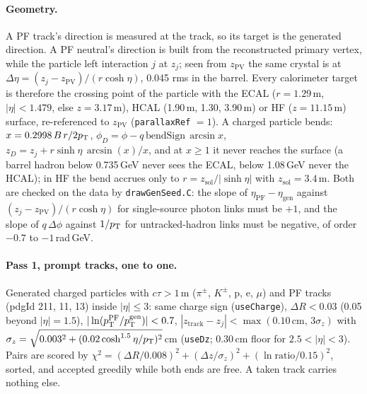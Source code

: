 \paragraph{Geometry.} A PF track's direction is measured at the track, so its
target is the generated direction. A PF neutral's direction is built from the
reconstructed primary vertex, while the particle left interaction $j$ at
$z_j$; seen from $z_{\mathrm{PV}}$ the same crystal is at $\Delta\eta = (z_j -
z_{\mathrm{PV}})/(r\cosh\eta)$, 0.045 rms in the barrel. Every calorimeter
target is therefore the crossing point of the particle with the ECAL
($r = 1.29$\,m, $|\eta| < 1.479$, else $z = 3.17$\,m), HCAL (1.90\,m, 1.30, 3.90\,m)
or HF ($z = 11.15$\,m) surface, re-referenced to $z_{\mathrm{PV}}$
(\texttt{parallaxRef} $= 1$). A charged particle bends: $x = 0.2998\,B\,r/2p_{\mathrm{T}}$,
$\phi_D = \phi - q\,\mathrm{bendSign}\,\arcsin x$, $z_D = z_j + r\sinh\eta\,\arcsin(x)/x$,
and at $x \ge 1$ it never reaches the surface (a barrel hadron below 0.735\,GeV
never sees the ECAL, below 1.08\,GeV never the HCAL); in HF the bend accrues
only to $r = z_{\mathrm{sol}}/|\sinh\eta|$ with $z_{\mathrm{sol}} = 3.4$\,m.
Both are checked on the data by \texttt{drawGenSeed.C}: the slope of
$\eta_{\mathrm{PF}} - \eta_{\mathrm{gen}}$ against $(z_j - z_{\mathrm{PV}})/(r\cosh\eta)$
for single-source photon links must be $+1$, and the slope of $q\,\Delta\phi$
against $1/p_{\mathrm{T}}$ for untracked-hadron links must be negative, of order
$-0.7$ to $-1$\,rad\,GeV.

\paragraph{Pass 1, prompt tracks, one to one.} Generated charged particles
with $c\tau > 1$\,m ($\pi^\pm$, $K^\pm$, p, e, $\mu$) and PF tracks (pdgId 211,
11, 13) inside $|\eta| \le 3$: same charge sign (\texttt{useCharge}),
$\Delta R < 0.03$ (0.05 beyond $|\eta| = 1.5$), $|\ln(p_{\mathrm{T}}^{\mathrm{PF}}/p_{\mathrm{T}}^{\mathrm{gen}})| < 0.7$,
$|z_{\mathrm{track}} - z_j| < \max(0.10\,\mathrm{cm},\, 3\sigma_z)$ with
$\sigma_z = \sqrt{0.003^2 + (0.02\cosh^{1.5}\eta/p_{\mathrm{T}})^2}$\,cm (\texttt{useDz};
0.30\,cm floor for $2.5 < |\eta| < 3$). Pairs are scored by
$\chi^2 = (\Delta R/0.008)^2 + (\Delta z/\sigma_z)^2 + (\ln\mathrm{ratio}/0.15)^2$,
sorted, and accepted greedily while both ends are free. A taken track carries
nothing else.

